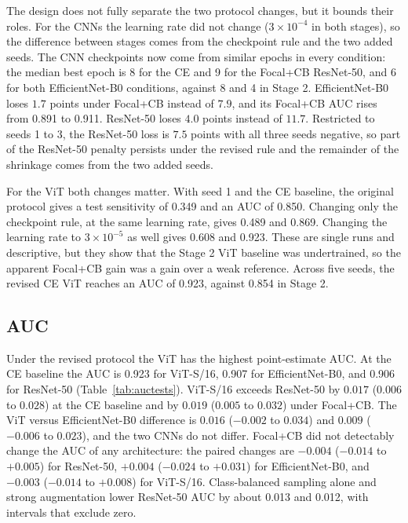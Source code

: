 \documentclass[11pt]{article}
\begin{document}
The design does not fully separate the two protocol changes, but it bounds their roles. For the CNNs the learning rate did not change ($3\times10^{-4}$ in both stages), so the difference between stages comes from the checkpoint rule and the two added seeds. The CNN checkpoints now come from similar epochs in every condition: the median best epoch is 8 for the CE and 9 for the Focal+CB ResNet-50, and 6 for both EfficientNet-B0 conditions, against 8 and 4 in Stage 2. EfficientNet-B0 loses $1.7$ points under Focal+CB instead of $7.9$, and its Focal+CB AUC rises from 0.891 to 0.911. ResNet-50 loses $4.0$ points instead of $11.7$. Restricted to seeds 1 to 3, the ResNet-50 loss is $7.5$ points with all three seeds negative, so part of the ResNet-50 penalty persists under the revised rule and the remainder of the shrinkage comes from the two added seeds.

For the ViT both changes matter. With seed 1 and the CE baseline, the original protocol gives a test sensitivity of 0.349 and an AUC of 0.850. Changing only the checkpoint rule, at the same learning rate, gives 0.489 and 0.869. Changing the learning rate to $3\times10^{-5}$ as well gives 0.608 and 0.923. These are single runs and descriptive, but they show that the Stage 2 ViT baseline was undertrained, so the apparent Focal+CB gain was a gain over a weak reference. Across five seeds, the revised CE ViT reaches an AUC of 0.923, against 0.854 in Stage 2.

\subsection{AUC}
\label{sec:auc}

Under the revised protocol the ViT has the highest point-estimate AUC. At the CE baseline the AUC is 0.923 for ViT-S/16, 0.907 for EfficientNet-B0, and 0.906 for ResNet-50 (Table~\ref{tab:auctests}). ViT-S/16 exceeds ResNet-50 by $0.017$ ($0.006$ to $0.028$) at the CE baseline and by $0.019$ ($0.005$ to $0.032$) under Focal+CB. The ViT versus EfficientNet-B0 difference is $0.016$ ($-0.002$ to $0.034$) and $0.009$ ($-0.006$ to $0.023$), and the two CNNs do not differ. Focal+CB did not detectably change the AUC of any architecture: the paired changes are $-0.004$ ($-0.014$ to $+0.005$) for ResNet-50, $+0.004$ ($-0.024$ to $+0.031$) for EfficientNet-B0, and $-0.003$ ($-0.014$ to $+0.008$) for ViT-S/16. Class-balanced sampling alone and strong augmentation lower ResNet-50 AUC by about 0.013 and 0.012, with intervals that exclude zero.
\end{document}
